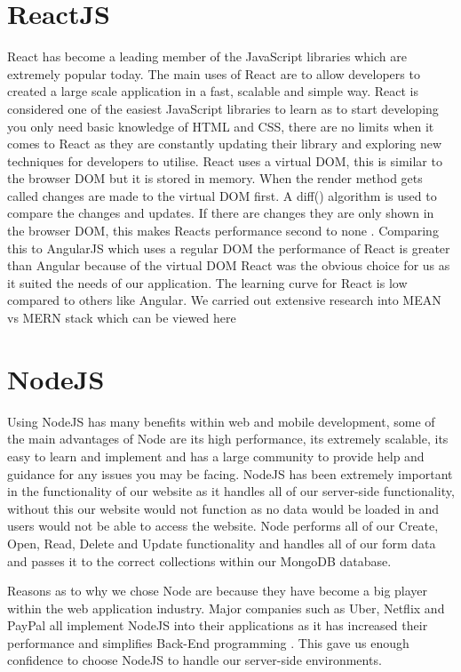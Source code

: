 \section{ReactJS}
React has become a leading member of the JavaScript libraries which are extremely popular today. The main uses of React are to allow developers to created a large scale application in a fast, scalable and simple way. React is considered one of the easiest JavaScript libraries to learn as to start developing you only need basic knowledge of HTML and CSS, there are no limits when it comes to React as they are constantly updating their library and exploring new techniques for developers to utilise. 
React uses a virtual DOM, this is similar to the browser DOM but it is stored in memory. When the render method gets called changes are made to the virtual DOM first. A diff() algorithm is used to compare the changes and updates. If there are changes they are only shown in the browser DOM, this makes Reacts performance second to none \cite{aggarwal2018modern}. Comparing this to AngularJS which uses a regular DOM the performance of React is greater than Angular because of the virtual DOM \cite{kumar2016comparative}
React was the obvious choice for us as it suited the needs of our application. The learning curve for React is low compared to others like Angular. We carried out extensive research into MEAN vs MERN stack which can be viewed here \pageref{Section:Stack Comparison: MEAN vs MERN} 
\newline

\section{NodeJS}
Using NodeJS has many benefits within web and mobile development, some of the main advantages of Node are its high performance, its extremely scalable, its easy to learn and implement and has a large community to provide help and guidance for any issues you may be facing. NodeJS has been extremely important in the functionality of our website as it handles all of our server-side functionality, without this our website would not function as no data would be loaded in and users would not be able to access the website. Node performs all of our Create, Open, Read, Delete and Update functionality and handles all of our form data and passes it to the correct collections within our MongoDB database. 

Reasons as to why we chose Node are because they have become a big player within the web application industry. Major companies such as Uber, Netflix and PayPal all implement NodeJS into their applications as it has increased their performance and simplifies Back-End programming \cite{NetflixNodeJS}. This gave us enough confidence to choose NodeJS to handle our server-side environments. 

